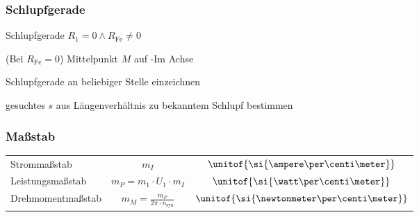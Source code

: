\begin{sectionbox}
\subsubsection{Schlupfgerade}
\begin{cookbox}{Schlupfgerade $R_1 = 0\wedge R_\text{Fe}\neq 0$}
\item (Bei $R_\text{Fe} = 0$) Mittelpunkt $M$ auf -Im Achse
\item Schlupfgerade an beliebiger Stelle einzeichnen
\item gesuchtes $s$ aus Längenverhältnis zu bekanntem Schlupf bestimmen
\end{cookbox}


\subsubsection{Maßstab}
\begin{symbolbox}
\begin{tabular}{p{2.8cm}cc}
Strommaßstab & $m_I$ & $\unitof{\si{\ampere\per\centi\meter}}$\\
Leistungsmaßstab & $m_P = m_1\cdot U_1\cdot m_I$ & $\unitof{\si{\watt\per\centi\meter}}$\\
Drehmomentmaßstab & $m_M = \frac{m_P}{2\pi\cdot n_\text{syn}}$ & $\unitof{\si{\newtonmeter\per\centi\meter}}$
\end{tabular}
\end{symbolbox}
\end{sectionbox}

